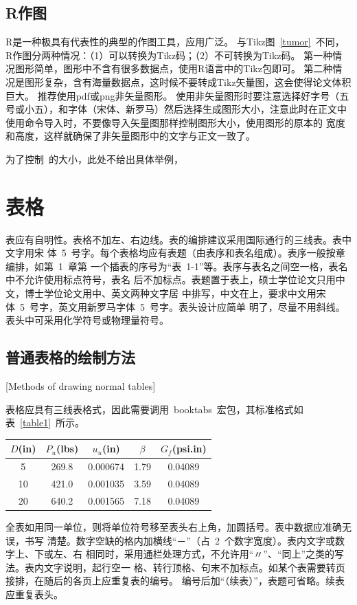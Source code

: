 \subsection{R作图}
R是一种极具有代表性的典型的作图工具，应用广泛。
与Tikz图~\ref{tumor}~不同，R作图分两种情况：（1）可以转换为Tikz码；（2）不可转换为Tikz码。
第一种情况图形简单，图形中不含有很多数据点，使用R语言中的Tikz包即可。
第二种情况是图形复杂，含有海量数据点，这时候不要转成Tikz矢量图，这会使得论文体积巨大。
推荐使用pdf或png非矢量图形。
使用非矢量图形时要注意选择好字号（五号或小五），和字体（宋体、新罗马）然后选择生成图形大小，注意此时在正文中使用命令导入时，不要像导入矢量图那样控制图形大小，使用图形的原本的
宽度和高度，这样就确保了非矢量图形中的文字与正文一致了。

为了控制\hithesis\ 的大小，此处不给出具体举例，

\section{表格}

表应有自明性。表格不加左、右边线。表的编排建议采用国际通行的三线表。表中文字用宋
体~5~号字。每个表格均应有表题（由表序和表名组成）。表序一般按章编排，如第~1~章第
一个插表的序号为“表~1-1”等。表序与表名之间空一格，表名中不允许使用标点符号，表名
后不加标点。表题置于表上，硕士学位论文只用中文，博士学位论文用中、英文两种文字居
中排写，中文在上，要求中文用宋体~5~号字，英文用新罗马字体~5~号字。表头设计应简单
明了，尽量不用斜线。表头中可采用化学符号或物理量符号。


\subsection{普通表格的绘制方法}[Methods of drawing normal tables]

表格应具有三线表格式，因此需要调用~booktabs~宏包，其标准格式如表~\ref{table1}~所示。
\begin{table}[htbp]
\vspace{0.5em}\centering\wuhao
\begin{tabular}{ccccc}
\toprule
$D$(in) & $P_u$(lbs) & $u_u$(in) & $\beta$ & $G_f$(psi.in)\\
\midrule
 5 & 269.8 & 0.000674 & 1.79 & 0.04089\\
10 & 421.0 & 0.001035 & 3.59 & 0.04089\\
20 & 640.2 & 0.001565 & 7.18 & 0.04089\\
\bottomrule
\end{tabular}
\end{table}
全表如用同一单位，则将单位符号移至表头右上角，加圆括号。表中数据应准确无误，书写
清楚。数字空缺的格内加横线“－”（占~2~个数字宽度）。表内文字或数字上、下或左、右
相同时，采用通栏处理方式，不允许用“〃”、“同上”之类的写法。表内文字说明，起行空一
格、转行顶格、句末不加标点。如某个表需要转页接排，在随后的各页上应重复表的编号。
编号后加“（续表）”，表题可省略。续表应重复表头。

